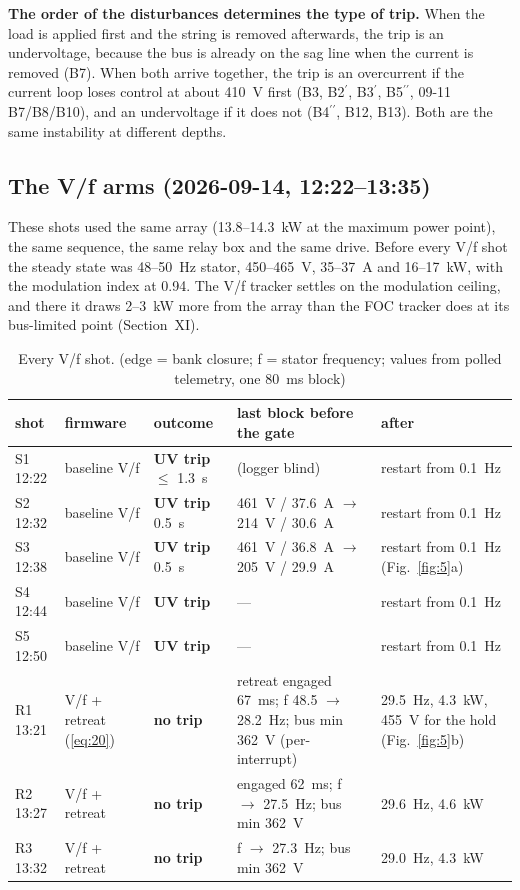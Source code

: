 \documentclass[journal]{IEEEtran}
\begin{document}
\textbf{The order of the disturbances determines the type of trip.} When the load is applied first and the string is removed afterwards, the trip is an undervoltage, because the bus is already on the sag line when the current is removed (B7). When both arrive together, the trip is an overcurrent if the current loop loses control at about 410~V first (B3, B2$^{\prime}$, B3$^{\prime}$, B5$^{\prime\prime}$, 09-11 B7/B8/B10), and an undervoltage if it does not (B4$^{\prime\prime}$, B12, B13). Both are the same instability at different depths.

\subsection{The V/f arms (2026-09-14, 12:22--13:35)}

These shots used the same array (13.8--14.3~kW at the maximum power point), the same sequence, the same relay box and the same drive. Before every V/f shot the steady state was 48--50~Hz stator, 450--465~V, 35--37~A and 16--17~kW, with the modulation index at 0.94. The V/f tracker settles on the modulation ceiling, and there it draws 2--3~kW more from the array than the FOC tracker does at its bus-limited point (Section~XI).

\begin{table}[!t]\caption{Every V/f shot. (edge = bank closure; f = stator frequency; values from polled telemetry, one 80~ms block)}\label{tab:3}\centering\scriptsize\setlength{\tabcolsep}{3pt}\renewcommand{\arraystretch}{0.9}
\begin{tabularx}{\columnwidth}{llXXX}\toprule
shot & firmware & outcome & last block before the gate & after \\
\midrule
S1 12:22 & baseline V/f & \textbf{UV trip} $\le$ 1.3~s & (logger blind) & restart from 0.1~Hz \\
S2 12:32 & baseline V/f & \textbf{UV trip} 0.5~s & 461~V / 37.6~A $\rightarrow$ 214~V / 30.6~A & restart from 0.1~Hz \\
S3 12:38 & baseline V/f & \textbf{UV trip} 0.5~s & 461~V / 36.8~A $\rightarrow$ 205~V / 29.9~A & restart from 0.1~Hz (Fig.~\ref{fig:5}a) \\
S4 12:44 & baseline V/f & \textbf{UV trip} & --- & restart from 0.1~Hz \\
S5 12:50 & baseline V/f & \textbf{UV trip} & --- & restart from 0.1~Hz \\
R1 13:21 & V/f + retreat (\ref{eq:20}) & \textbf{no trip} & retreat engaged 67~ms; f 48.5 $\rightarrow$ 28.2~Hz; bus min 362~V (per-interrupt) & 29.5~Hz, 4.3~kW, 455~V for the hold (Fig.~\ref{fig:5}b) \\
R2 13:27 & V/f + retreat & \textbf{no trip} & engaged 62~ms; f $\rightarrow$ 27.5~Hz; bus min 362~V & 29.6~Hz, 4.6~kW \\
R3 13:32 & V/f + retreat & \textbf{no trip} & f $\rightarrow$ 27.3~Hz; bus min 362~V & 29.0~Hz, 4.3~kW \\
\bottomrule\end{tabularx}\end{table}
\end{document}
